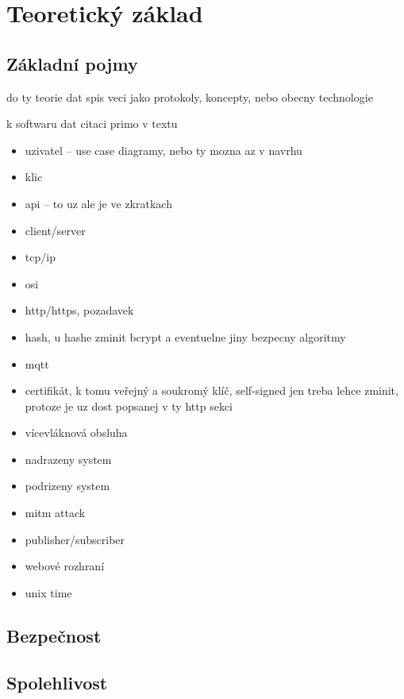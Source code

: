 \chapter{Teoretický základ}
\label{sec:te}

\section{Základní pojmy}

do ty teorie dat spis veci jako protokoly, koncepty, nebo obecny technologie

k softwaru dat citaci primo v textu

\begin{itemize}
    \item uzivatel -- use case diagramy, nebo ty mozna az v navrhu
    \item klic
    \item api -- to uz ale je ve zkratkach
    \item client/server
    \item tcp/ip
    \item osi
    \item http/https, pozadavek
    \item hash, u hashe zminit bcrypt a eventuelne jiny bezpecny algoritmy
    \item mqtt
    \item certifikát, k tomu veřejný a soukromý klíč, self-signed jen treba lehce zminit, protoze je uz dost popsanej v ty http sekci
    \item vícevláknová obsluha
    \item nadrazeny system
    \item podrizeny system
    \item mitm attack
    \item publisher/subscriber
    \item webové rozhraní
    \item unix time
\end{itemize}

\section{Bezpečnost}

\section{Spolehlivost}